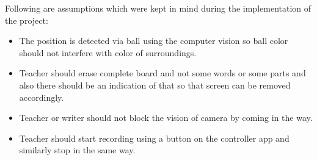 Following are assumptions which were kept in mind during the implementation of the project:

\begin{itemize}

\item The position is detected via ball using the computer vision so ball color should not interfere with color of surroundings.

\item Teacher should erase complete board and not some words or some parts and also there should be an indication of that so that screen can be removed accordingly.

\item Teacher or writer should not block the vision of camera by coming in the way.

\item Teacher should start recording using a button on the controller app and similarly stop in the same way.

\end{itemize}























